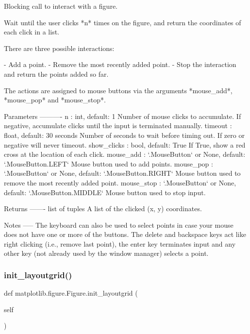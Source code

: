 \begin{DoxyVerb}Blocking call to interact with a figure.

Wait until the user clicks *n* times on the figure, and return the
coordinates of each click in a list.

There are three possible interactions:

- Add a point.
- Remove the most recently added point.
- Stop the interaction and return the points added so far.

The actions are assigned to mouse buttons via the arguments
*mouse_add*, *mouse_pop* and *mouse_stop*.

Parameters
----------
n : int, default: 1
    Number of mouse clicks to accumulate. If negative, accumulate
    clicks until the input is terminated manually.
timeout : float, default: 30 seconds
    Number of seconds to wait before timing out. If zero or negative
    will never timeout.
show_clicks : bool, default: True
    If True, show a red cross at the location of each click.
mouse_add : `.MouseButton` or None, default: `.MouseButton.LEFT`
    Mouse button used to add points.
mouse_pop : `.MouseButton` or None, default: `.MouseButton.RIGHT`
    Mouse button used to remove the most recently added point.
mouse_stop : `.MouseButton` or None, default: `.MouseButton.MIDDLE`
    Mouse button used to stop input.

Returns
-------
list of tuples
    A list of the clicked (x, y) coordinates.

Notes
-----
The keyboard can also be used to select points in case your mouse
does not have one or more of the buttons.  The delete and backspace
keys act like right clicking (i.e., remove last point), the enter key
terminates input and any other key (not already used by the window
manager) selects a point.
\end{DoxyVerb}
 \mbox{\label{classmatplotlib_1_1figure_1_1Figure_a5f86c86c033586ea7d732dd0ba856659}} 
\subsubsection{\texorpdfstring{init\+\_\+layoutgrid()}{init\_layoutgrid()}}
{\footnotesize\ttfamily def matplotlib.\+figure.\+Figure.\+init\+\_\+layoutgrid (\begin{DoxyParamCaption}\item[{}]{self }\end{DoxyParamCaption})}

